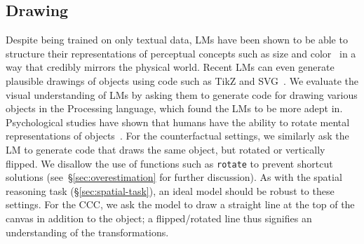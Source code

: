 \subsection{Drawing}\label{sec:drawing-task}

Despite being trained on only textual data, LMs have been shown to be able to structure their representations of perceptual concepts such as size and color~  in a way that credibly mirrors the physical world. Recent LMs can even generate plausible drawings of objects using code such  as TikZ and SVG~\cite{bubeck2023sparks,zhang2023controllable}. We evaluate the visual understanding of LMs by asking them to generate code for drawing various objects in the Processing language, which \citet{sharma2024vision} found the LMs to be more adept in. Psychological studies have shown that humans have the ability to rotate mental representations of objects~\cite{shepard1971mental, vandenberg1978mental}. For the counterfactual settings, we similarly ask the LM to generate code that draws the same object, but rotated or vertically flipped. We disallow the use of functions such as \texttt{rotate} to prevent  shortcut solutions  (see~\S\ref{sec:overestimation} for further discussion).
As with the spatial reasoning task (\S\ref{sec:spatial-task}), an ideal model should be robust to these settings.
For the CCC, we ask the model to draw a straight  line at the top of the canvas in addition to the object; a flipped/rotated line thus signifies an understanding of the transformations.
